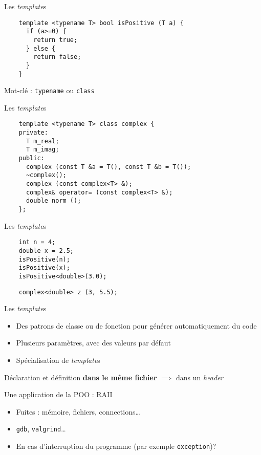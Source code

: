 \begin{frame}[fragile]{Les \textit{template}s}
  \begin{lstlisting}
    template <typename T> bool isPositive (T a) {
      if (a>=0) {
        return true;
      } else {
        return false;
      }
    }
  \end{lstlisting}

  Mot-clé : \texttt{typename} ou \texttt{class}
\end{frame}

\begin{frame}[fragile]{Les \textit{template}s}
  \begin{lstlisting}
    template <typename T> class complex {
    private:
      T m_real;
      T m_imag;
    public:
      complex (const T &a = T(), const T &b = T());
      ~complex();
      complex (const complex<T> &);
      complex& operator= (const complex<T> &);
      double norm ();
    };
  \end{lstlisting}
\end{frame}

\begin{frame}[fragile]{Les \textit{template}s}
  \begin{lstlisting}
    int n = 4;
    double x = 2.5;
    isPositive(n);
    isPositive(x);
    isPositive<double>(3.0);
  \end{lstlisting}

  \begin{lstlisting}
    complex<double> z (3, 5.5);
  \end{lstlisting}
\end{frame}

\begin{frame}{Les \textit{template}s}
  \begin{itemize}
  \item  Des patrons de classe ou de fonction pour générer automatiquement du code
  \item Plusieurs paramètres, avec des valeurs par défaut
  \item Spécialisation de \textit{template}s
  \end{itemize}

  Déclaration et définition \textbf{dans le même fichier} $\implies$ dans un \textit{header}
\end{frame}

\begin{frame}{Une application de la POO : RAII}
  \begin{itemize}
  \item Fuites : mémoire, fichiers, connections\dots{}
  \item \texttt{gdb}, \texttt{valgrind}\dots{}
  \item En cas d'interruption du programme (par exemple \texttt{exception})?
  \end{itemize}
\end{frame}

